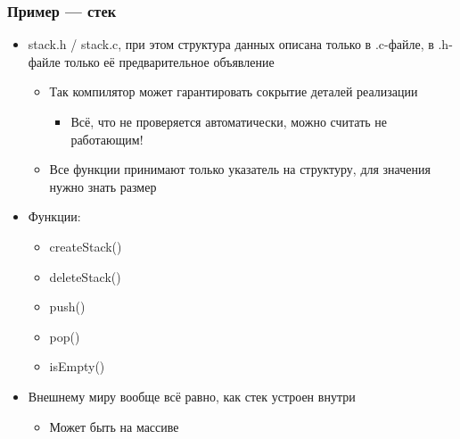\documentclass[xetex,mathserif,serif]{beamer}
\begin{document}
    \begin{frame}
        \frametitle{Пример --- стек}
        \begin{itemize}
            \item stack.h / stack.c, при этом структура данных описана только в .c-файле, в .h-файле только её предварительное объявление
            \begin{itemize}
                \item Так компилятор может гарантировать сокрытие деталей реализации
                \begin{itemize}
                    \item Всё, что не проверяется автоматически, можно считать не работающим!
                \end{itemize}
                \item Все функции принимают только указатель на структуру, для значения нужно знать размер
            \end{itemize}
            \item Функции:
            \begin{itemize}
                \item createStack()
                \item deleteStack()
                \item push()
                \item pop()
                \item isEmpty()
            \end{itemize}
            \item Внешнему миру вообще всё равно, как стек устроен внутри
            \begin{itemize}
                \item Может быть на массиве
            \end{itemize}
        \end{itemize}
    \end{frame}
\end{document}

